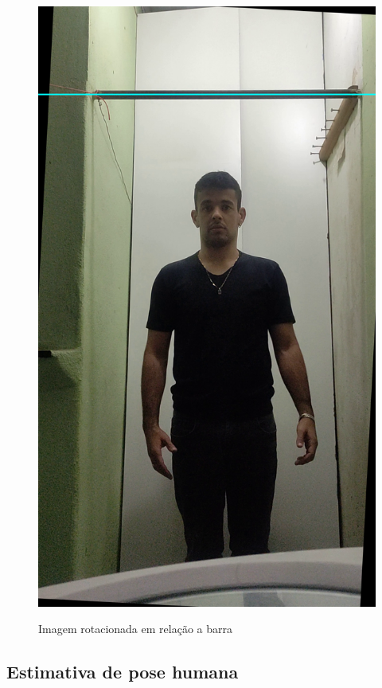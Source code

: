 \begin{figure}[H]
	\centering
	\caption{Imagem rotacionada em relação a barra}
	\includegraphics[scale=0.12]{figuras/processo/detectarBarra/barra_rotacionada.png}
	\label{fig:Barra rotacionada}
\end{figure}




\subsection[Reconhecimento de pose humana]{Estimativa de pose humana}\label{sec:Reconhecimento de pose humana}

